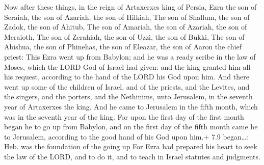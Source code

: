  Now after these things, in the reign of Artaxerxes king of
Persia, Ezra the son of Seraiah, the son of Azariah, the son of Hilkiah,
 The son of Shallum, the son of Zadok, the son of Ahitub,
 The son of Amariah, the son of Azariah, the son of
Meraioth,  The son of Zerahiah, the son of Uzzi, the son of
Bukki,  The son of Abishua, the son of Phinehas, the son of
Eleazar, the son of Aaron the chief priest:  This Ezra went
up from Babylon; and he was a ready scribe in the law of Moses, which
the LORD God of Israel had given: and the king granted him all his
request, according to the hand of the LORD his God upon him.
 And there went up some of the children of Israel, and of
the priests, and the Levites, and the singers, and the porters, and the
Nethinims, unto Jerusalem, in the seventh year of Artaxerxes the king.
 And he came to Jerusalem in the fifth month, which was in
the seventh year of the king.  For upon the first day of the
first month began he to go up from Babylon, and on the first day of the
fifth month came he to Jerusalem, according to the good hand of his God
upon him.+ 7.9 began\ldots: Heb. was the foundation of the going up
 For Ezra had prepared his heart to seek the law of the
LORD, and to do it, and to teach in Israel statutes and judgments.

